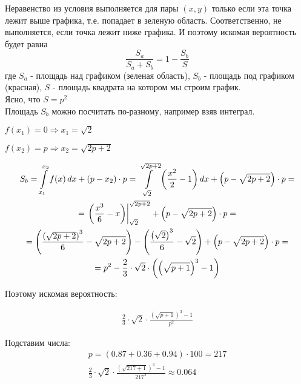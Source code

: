 \documentclass[a4paper,12pt]{article}
\begin{document}
Неравенство из условия выполняется для пары $(x, y)$ только если эта точка лежит выше графика, т.е. попадает в зеленую область.
Соответственно, не выполняется, если точка лежит ниже графика.
И поэтому искомая вероятность будет равна
\[\frac{S_{a}}{S_{a} + S_{b}} = 1 - \frac{S_b}{S}\]
где $S_a$ - площадь над графиком (зеленая область), $S_b$ - площадь под графиком (красная), $S$ - площадь квадрата на котором мы строим график.
\\

Ясно, что $S = p^2$
\\

Площадь $S_b$ можно посчитать по-разному, например взяв интеграл.

$f(x_1) = 0 \Rightarrow x_1 = \sqrt{2}$

$f(x_2) = p \Rightarrow x_2 = \sqrt{2p + 2}$

\begin{gather*}
S_b = \int\displaylimits_{x_1}^{x_2} f(x) \, dx + (p - x_2) \cdot p = \int\displaylimits_{\sqrt{2}}^{\sqrt{2p + 2}} \left( \frac{x^2}{2} - 1 \right) dx + \left( p - \sqrt{2p + 2} \right) \cdot p = \\
= \left. \left( \frac{x^3}{6} - x \right) \right|_{\sqrt{2}}^{\sqrt{2p+2}} + \left( p - \sqrt{2p + 2} \right) \cdot p = \\
= \left( \frac{\left( \sqrt{2p+2} \right)^3}{6} - \sqrt{2p+2} \right) - \left( \frac{ \left( \sqrt{2} \right)^3}{6} - \sqrt{2} \right) + \left( p - \sqrt{2p + 2} \right) \cdot p = \\
= p^2 - \frac{2}{3} \cdot \sqrt{2} \cdot \left( \left( \sqrt{p + 1} \right)^3 - 1 \right)
\end{gather*}

Поэтому искомая вероятность:

\begin{gather*}
\frac{2}{3} \cdot \sqrt{2} \cdot \frac{ \left( \sqrt{p + 1} \right)^3 - 1}{p^2}
\end{gather*}

Подставим числа:
\begin{gather*}
p = (0.87 + 0.36 + 0.94) \cdot 100 = 217 \\
\frac{2}{3} \cdot \sqrt{2} \cdot \frac{ \left( \sqrt{217 + 1} \right)^3 - 1}{217^2} \approx 0.064
\end{gather*}
\end{document}
